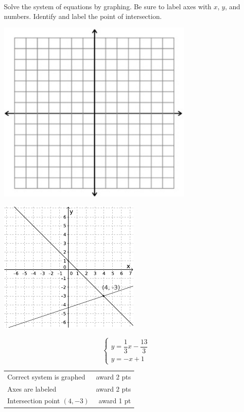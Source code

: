 {
	Solve the system of equations by graphing. Be sure to label axes with $x$, $y$, and numbers. Identify and label the point of intersection. \begin{onlyproblem}\begin{center}\includegraphics{fig-graphpaper.png}\end{center}\end{onlyproblem} \begin{onlysolution}\begin{center}\includegraphics{fig095-10-5-d-answer}\end{center}\end{onlysolution}
	$$\begin{cases} y=\dfrac{1}{3}x-\dfrac{13}{3}\\ y=-x+1\end{cases}$$
}
{
	\begin{tabular}{l r}
	Correct system is graphed & award 2 pts\\
	Axes are labeled & award 2 pts\\
	Intersection point $(4,-3)$ & award 1 pt
	\end{tabular}
}

